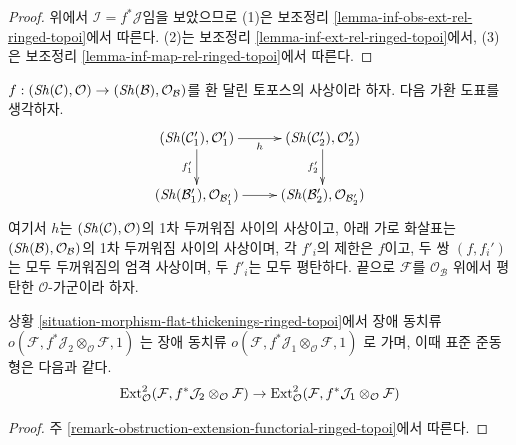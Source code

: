 \begin{proof}
위에서 $\mathcal{I} = f^*\mathcal{J}$임을 보았으므로 (1)은 보조정리
\ref{lemma-inf-obs-ext-rel-ringed-topoi}에서 따른다. (2)는 보조정리
\ref{lemma-inf-ext-rel-ringed-topoi}에서, (3)은 보조정리
\ref{lemma-inf-map-rel-ringed-topoi}에서 따른다.
\end{proof}

\begin{situation}
\label{situation-morphism-flat-thickenings-ringed-topoi}
$f : (\mathop{\mathit{Sh}}\nolimits(\mathcal{C}), \mathcal{O}) \to
(\mathop{\mathit{Sh}}\nolimits(\mathcal{B}), \mathcal{O}_\mathcal{B})$를 환 달린 토포스의 사상이라
하자. 다음 가환 도표를 생각하자.
$$
\xymatrix{
(\Sh(\mathcal{C}'_1), \mathcal{O}'_1) \ar[r]_h \ar[d]_{f'_1} &
(\Sh(\mathcal{C}'_2), \mathcal{O}'_2) \ar[d]_{f'_2} \\
(\Sh(\mathcal{B}'_1), \mathcal{O}_{\mathcal{B}'_1}) \ar[r] &
(\Sh(\mathcal{B}'_2), \mathcal{O}_{\mathcal{B}'_2})
}
$$
여기서 $h$는 $(\mathop{\mathit{Sh}}\nolimits(\mathcal{C}), \mathcal{O})$의 1차 두꺼워짐 사이의
사상이고, 아래 가로 화살표는
$(\mathop{\mathit{Sh}}\nolimits(\mathcal{B}), \mathcal{O}_\mathcal{B})$의 1차 두꺼워짐 사이의
사상이며, 각 $f'_i$의 제한은 $f$이고, 두 쌍 $(f, f_i')$는 모두
두꺼워짐의 엄격 사상이며, 두 $f'_i$는 모두 평탄하다. 끝으로
$\mathcal{F}$를 $\mathcal{O}_\mathcal{B}$ 위에서 평탄한
$\mathcal{O}$-가군이라 하자.
\end{situation}

\begin{lemma}
\label{lemma-functorial-ringed-topoi}
상황 \ref{situation-morphism-flat-thickenings-ringed-topoi}에서 장애 동치류
$o(\mathcal{F}, f^*\mathcal{J}_2 \otimes_\mathcal{O} \mathcal{F}, 1)$
는 장애 동치류
$o(\mathcal{F}, f^*\mathcal{J}_1 \otimes_\mathcal{O} \mathcal{F}, 1)$
로 가며, 이때 표준 준동형은 다음과 같다.
$$
\mathop{\mathrm{Ext}}\nolimits^2_\mathcal{O}(
\mathcal{F}, f^*\mathcal{J}_2 \otimes_\mathcal{O} \mathcal{F})
\to \mathop{\mathrm{Ext}}\nolimits^2_\mathcal{O}(
\mathcal{F}, f^*\mathcal{J}_1 \otimes_\mathcal{O} \mathcal{F})
$$
\end{lemma}

\begin{proof}
주 \ref{remark-obstruction-extension-functorial-ringed-topoi}에서 따른다.
\end{proof}

